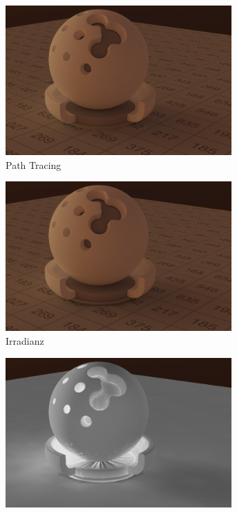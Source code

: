 		\begin{figure}[h]
			\begin{subfigure}[t]{0.33\textwidth}
				\center
				\includegraphics[width=0.95\textwidth]{pic/irr_est-ra-shaderball-ref.png}
				\caption{Path Tracing}
			\end{subfigure}
			\begin{subfigure}[t]{0.33\textwidth}
				\center
				\includegraphics[width=0.95\textwidth]{pic/irr_est-ra-shaderball-irr.png}
				\caption{Irradianz}
			\end{subfigure}
			\begin{subfigure}[t]{0.33\textwidth}
				\center
				\includegraphics[width=0.95\textwidth]{pic/irr_est-ra-shaderball-scount.png}

\end{subfigure}
\end{figure}
